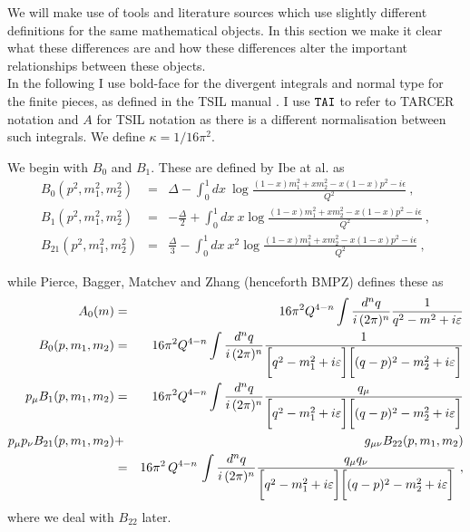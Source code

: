 \documentclass[11pt]{article}
\newcommand{\tsil}{\textsf{TSIL} }
\newcommand{\tarcer}{\textsf{TARCER} }
\begin{document}
We will make use of tools and literature sources which use slightly different definitions for the same mathematical objects.  In this section we make it clear what these differences are and how these differences alter the important relationships between these objects.\\

In the following I use bold-face for the divergent integrals and normal type for the finite pieces, as defined in the \tsil manual \cite{Martin2006}.  I use $\tt{TAI}$ to refer to \tarcer notation and $A$ for \tsil notation as there is a different normalisation between such integrals.  We define $\kappa = 1/16\pi^2$.

We begin with $B_0$ and $B_1$.  These are defined by Ibe at al. \cite{Ibe2013a} as
\begin{eqnarray}
B_0(p^2, m_1^2, m_2^2) &=& \Delta
- \int_0^1 dx ~\log \frac{ (1-x)m_1^2 + x m_2^2 - x(1-x)p^2 -i\epsilon }{Q^2}\ ,\label{eqn:B0_def} \\
B_1(p^2, m_1^2, m_2^2) &=& -\frac{\Delta}{2}
+ \int_0^1 dx ~x\log \frac{ (1-x)m_1^2 + x m_2^2 - x(1-x)p^2 -i\epsilon }{Q^2}\ ,\label{eqn:B1_def} \\
B_{21}(p^2, m_1^2, m_2^2) &=& \frac{\Delta}{3}
- \int_0^1 dx ~x^2\log \frac{ (1-x)m_1^2 + x m_2^2 - x(1-x)p^2 -i\epsilon }{Q^2}\ ,
\end{eqnarray}

while Pierce, Bagger, Matchev and Zhang \cite{Pierce1996} (henceforth BMPZ) defines these as
\begin{eqnarray}
A_0(m) &=& 16\pi^2Q^{4-n}\int{d^nq\over i\,(2\pi)^n}{1\over
q^2-m^2+i\varepsilon}\\
B_0(p, m_1, m_2) &=&
16\pi^2Q^{4-n}\int{d^nq\over i\,(2\pi)^n}
{1\over\biggl[q^2-m^2_1+i\varepsilon\biggr]\biggl[
(q-p)^2-m_2^2+i\varepsilon\biggr]}
\label{B0 def}  \\
p_\mu B_1(p, m_1,m_2) &=& 16\pi^2Q^{4-n}\int
{d^nq\over i\,(2\pi)^n}{q_\mu\over\biggl[q^2-m^2_1+i\varepsilon\biggr]
\biggl[(q-p)^2-m_2^2+i\varepsilon\biggr]}\label{B1 def} \\ p_\mu p_\nu
B_{21}(p,m_1,m_2) &+& g_{\mu\nu}B_{22}(p,m_1,m_2)
\label{B22 def}\\
 &=& 16\pi^2\,Q^{4-n}\,\int{d^nq\over i\,(2\pi)^n} {q_\mu
q_\nu\over\biggl[q^2-m^2_1+i\varepsilon\biggr]\biggl[
(q-p)^2-m_2^2+i\varepsilon\biggr]}\ , \nonumber
\end{eqnarray}
where we deal with $B_{22}$ later.\\  
\end{document}
